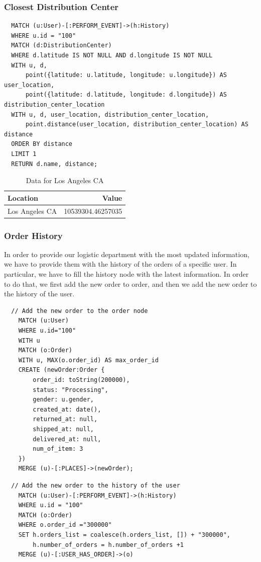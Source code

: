 \documentclass[a4paper,12pt]{article}
\begin{document}
\subsubsection{Closest Distribution Center}
\begin{verbatim}
  MATCH (u:User)-[:PERFORM_EVENT]->(h:History)
  WHERE u.id = "100"
  MATCH (d:DistributionCenter)
  WHERE d.latitude IS NOT NULL AND d.longitude IS NOT NULL
  WITH u, d, 
      point({latitude: u.latitude, longitude: u.longitude}) AS user_location, 
      point({latitude: d.latitude, longitude: d.longitude}) AS distribution_center_location
  WITH u, d, user_location, distribution_center_location, 
      point.distance(user_location, distribution_center_location) AS distance
  ORDER BY distance
  LIMIT 1
  RETURN d.name, distance;
\end{verbatim}

\begin{table}[h!]
  \centering
  \caption{Data for Los Angeles CA}
  \label{tab:los_angeles_data}
  \begin{tabular}{l r}
      \toprule
      \textbf{Location} & \textbf{Value} \\
      \midrule
      Los Angeles CA & 10539304.46257035 \\
      \bottomrule
  \end{tabular}
\end{table}

\subsubsection{Order History}
In order to provide our logistic department with the most updated information, we have to provide them with the history of the orders of a specific user.
In particular, we have to fill the history node with the latest information. In order to do that, we first add the new order to order, and then we add the new order to the history of the user.
\begin{verbatim}
  // Add the new order to the order node
    MATCH (u:User)
    WHERE u.id="100"
    WITH u
    MATCH (o:Order)
    WITH u, MAX(o.order_id) AS max_order_id
    CREATE (newOrder:Order { 
        order_id: toString(200000), 
        status: "Processing",
        gender: u.gender,
        created_at: date(),
        returned_at: null,
        shipped_at: null,
        delivered_at: null,
        num_of_item: 3
    })
    MERGE (u)-[:PLACES]->(newOrder);
\end{verbatim}
\begin{verbatim}
  // Add the new order to the history of the user
    MATCH (u:User)-[:PERFORM_EVENT]->(h:History)
    WHERE u.id = "100"
    MATCH (o:Order)
    WHERE o.order_id ="300000"
    SET h.orders_list = coalesce(h.orders_list, []) + "300000",
        h.number_of_orders = h.number_of_orders +1
    MERGE (u)-[:USER_HAS_ORDER]->(o)
\end{verbatim}
\end{document}
